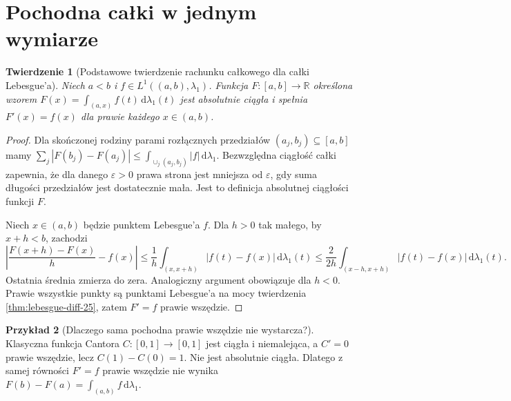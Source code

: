 \documentclass[11pt,a4paper,oneside]{book}
\numberwithin{equation}{chapter}
\theoremstyle{plain}
\newtheorem{twierdzenie}{Twierdzenie}[chapter]
\theoremstyle{definition}
\newtheorem{przyklad}[twierdzenie]{Przykład}
\theoremstyle{remark}
\begin{document}
\section{Pochodna całki w jednym wymiarze}
\begin{twierdzenie}[Podstawowe twierdzenie rachunku całkowego dla całki Lebesgue'a]
\label{thm:FTC-lebesgue-25}
Niech $a<b$ i $f\in L^1((a,b),\lambda_1)$. Funkcja
$F:[a,b]\to\mathbb R$ określona wzorem
$F(x)=\int_{(a,x)}f(t)\,\mathrm d\lambda_1(t)$
jest absolutnie ciągła i spełnia
$F'(x)=f(x)$ dla prawie każdego $x\in(a,b)$.
\end{twierdzenie}
\begin{proof}
Dla skończonej rodziny parami rozłącznych przedziałów
$(a_j,b_j)\subseteq[a,b]$ mamy
$\sum_j|F(b_j)-F(a_j)|
\le\int_{\cup_j(a_j,b_j)}|f|\,\mathrm d\lambda_1$.
Bezwzględna ciągłość całki zapewnia, że dla danego
$\varepsilon>0$ prawa strona jest mniejsza od
$\varepsilon$, gdy suma długości przedziałów jest
dostatecznie mała. Jest to definicja absolutnej
ciągłości funkcji $F$.

Niech $x\in(a,b)$ będzie punktem Lebesgue'a $f$.
Dla $h>0$ tak małego, by $x+h<b$, zachodzi
\[
 \left|\frac{F(x+h)-F(x)}h-f(x)\right|
 \le\frac1h\int_{(x,x+h)}|f(t)-f(x)|\,
 \mathrm d\lambda_1(t)
 \le\frac2{2h}\int_{(x-h,x+h)}|f(t)-f(x)|\,
 \mathrm d\lambda_1(t).
\]
Ostatnia średnia zmierza do zera. Analogiczny argument
obowiązuje dla $h<0$. Prawie wszystkie punkty są
punktami Lebesgue'a na mocy twierdzenia
\ref{thm:lebesgue-diff-25}, zatem $F'=f$ prawie
wszędzie.
\end{proof}

\begin{przyklad}[Dlaczego sama pochodna prawie wszędzie nie wystarcza?]
Klasyczna funkcja Cantora $C:[0,1]\to[0,1]$ jest
ciągła i niemalejąca, a $C'=0$ prawie wszędzie, lecz
$C(1)-C(0)=1$. Nie jest absolutnie ciągła.
Dlatego z samej równości $F'=f$ prawie wszędzie nie
wynika $F(b)-F(a)=\int_{(a,b)}f\,\mathrm d\lambda_1$.
\end{przyklad}
\end{document}
